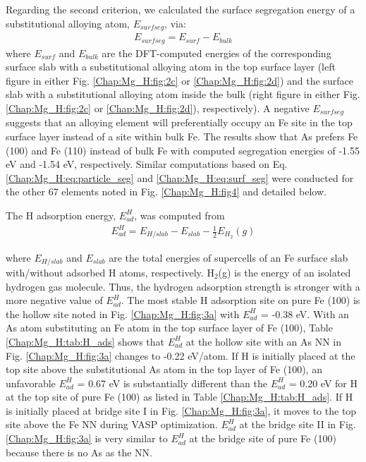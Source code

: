Regarding the second criterion, we calculated the surface segregation energy of a substitutional alloying atom, $E_{surf seg}$, via:
\begin{align}
 E_{surf seg} = E_{surf} - E_{bulk}
 \label{Chap:Mg_H:eq:surf_seg}
\end{align}
where $E_{surf}$ and $E_{bulk}$ are the \ac{DFT}-computed energies of the corresponding surface slab with a substitutional alloying atom in the top surface layer (left figure in either Fig. \ref{Chap:Mg_H:fig:2c} or \ref{Chap:Mg_H:fig:2d}) and the surface slab with a substitutional alloying atom inside the bulk (right figure in either Fig. \ref{Chap:Mg_H:fig:2c} or \ref{Chap:Mg_H:fig:2d}), respectively). A negative $E_{surf seg}$ suggests that an alloying element will preferentially occupy an Fe site in the top surface layer instead of a site within bulk Fe. The results show that As prefers Fe (100) and Fe (110) instead of bulk Fe with computed segregation energies of -1.55 eV and -1.54 eV, respectively. Similar computations based on Eq. \ref{Chap:Mg_H:eq:particle_seg} and \ref{Chap:Mg_H:eq:surf_seg} were conducted for the other 67 elements noted in Fig. \ref{Chap:Mg_H:fig4} and detailed below.

The H adsorption energy, $E_{ad}^H$, was computed from  
\begin{align}
 E_{ad}^{H} = E_{H/slab} - E_{slab} - \frac{1}{2}E_{H_2}(g)
 \label{Chap:Mg_H:eq:H_ads}
\end{align}

where $E_{H/slab}$ and $E_{slab}$ are the total energies of supercells of an Fe surface slab with/without adsorbed H atoms, respectively. $\text{H}_2$(g) is the energy of an isolated hydrogen gas molecule. Thus, the hydrogen adsorption strength is stronger with a more negative value of $E_{ad}^H$. The most stable H adsorption site on pure Fe (100) is the hollow site noted in Fig. \ref{Chap:Mg_H:fig:3a} with $E_{ad}^H$ = -0.38 eV. With an As atom substituting an Fe atom in the top surface layer of Fe (100), Table \ref{Chap:Mg_H:tab:H_ads} shows that $E_{ad}^H$ at the hollow site with an As NN in Fig. \ref{Chap:Mg_H:fig:3a} changes to -0.22 eV/atom. If H is initially placed at the top site above the substitutional As atom in the top layer of Fe (100), an unfavorable $E_{ad}^H$ = 0.67 eV is substantially different than the $E_{ad}^H$ = 0.20 eV for H at the top site of pure Fe (100) as listed in Table \ref{Chap:Mg_H:tab:H_ads}. If H is initially placed at bridge site I in Fig. \ref{Chap:Mg_H:fig:3a}, it moves to the top site above the Fe NN during \ac{VASP} optimization. $E_{ad}^H$ at the bridge site II in Fig. \ref{Chap:Mg_H:fig:3a} is very similar to $E_{ad}^H$ at the bridge site of pure Fe (100) because there is no As as the NN.

